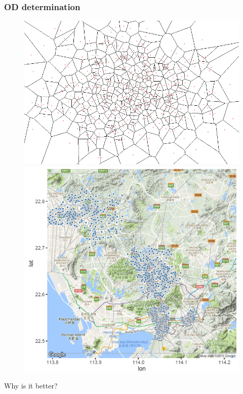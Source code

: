 \documentclass[11pt]{beamer}
\begin{document}
\begin{frame}
   \frametitle{OD determination}
 \begin{figure}
   \begin{minipage}{0.45\textwidth}
   	\centering
    \includegraphics[width=1\textwidth]{voronoi}
   \end{minipage}%
   \begin{minipage}{0.45\textwidth}
   	\centering
    \includegraphics[width=1\textwidth]{voronoi2}
   \end{minipage}
    
  \end{figure}
Why is it better?
\end{frame}
\end{document}
